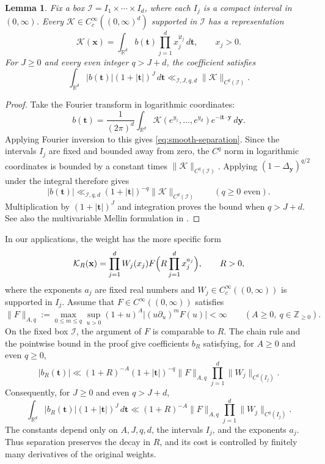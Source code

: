 \documentclass[11pt,a4paper]{article}
\numberwithin{equation}{section}
\numberwithin{figure}{section}
\newtheorem{lemma}[theorem]{Lemma}
\theoremstyle{definition}
\theoremstyle{remark}
\newcommand{\dd}{\,d}
\begin{document}
\begin{lemma}\label{lem:smooth}
Fix a box $\mathcal I=I_1\times\cdots\times I_d$, where each $I_j$ is a
compact interval in $(0,\infty)$. Every $\mathcal K\in C_c^\infty((0,\infty)^d)$
supported in $\mathcal I$ has a representation
\begin{equation}\label{eq:smooth-separation}
 \mathcal K(\mathbf x)=\int_{\mathbb R^d}b(\mathbf t)
       \prod_{j=1}^d x_j^{\mathrm i t_j}\dd\mathbf t,
 \qquad x_j>0.
\end{equation}
For $J\ge0$ and every even integer $q>J+d$, the coefficient satisfies
\[
 \int_{\mathbb R^d}|b(\mathbf t)|(1+|\mathbf t|)^J\dd\mathbf t
 \ll_{\mathcal I,J,q,d}\|\mathcal K\|_{C^q(\mathcal I)}.
\]
\end{lemma}
\begin{proof}
Take the Fourier transform in logarithmic coordinates:
\[
 b(\mathbf t)=\frac1{(2\pi)^d}\int_{\mathbb R^d}
 \mathcal K(e^{y_1},\ldots,e^{y_d})
 e^{-\mathrm i\mathbf t\cdot\mathbf y}\dd\mathbf y.
\]
Applying Fourier inversion to this gives \eqref{eq:smooth-separation}. Since the intervals $I_j$ are fixed and bounded away from zero, the $C^q$ norm in logarithmic coordinates is bounded by a constant times
$\|\mathcal K\|_{C^q(\mathcal I)}$. Applying
$(1-\Delta_{\mathbf y})^{q/2}$ under the integral therefore gives
\[
 |b(\mathbf t)|\ll_{\mathcal I,q,d}
 (1+|\mathbf t|)^{-q}\|\mathcal K\|_{C^q(\mathcal I)}
 \qquad(q\ge0\text{ even}).
\]
Multiplication by $(1+|\mathbf t|)^J$ and integration proves the
bound when $q>J+d$. See also the multivariable Mellin formulation
in \cite[\S10.1, (130)--(131)]{PY19}.
\end{proof}

In our applications, the weight has the more specific form
\[
 \mathcal K_R(\mathbf x)=\prod_{j=1}^dW_j(x_j)
 F\Bigl(R\prod_{j=1}^d x_j^{a_j}\Bigr),\qquad R>0,
\]
where the exponents $a_j$ are fixed real numbers and
$W_j\in C_c^\infty((0,\infty))$ is supported in $I_j$.
Assume that $F\in C^\infty((0,\infty))$ satisfies
\[
 \|F\|_{A,q}:=\max_{0\le m\le q}\sup_{u>0}
 (1+u)^A\bigl|(u\partial_u)^mF(u)\bigr|<\infty
 \qquad(A\ge0,\ q\in\mathbb Z_{\ge0}).
\]
On the fixed box $\mathcal I$, the argument of $F$ is comparable
to $R$. The chain rule and the pointwise bound in the proof give
coefficients $b_R$ satisfying, for $A\ge0$ and even $q\ge0$,
\begin{equation}\label{eq:smooth-pointwise}
 |b_R(\mathbf t)|
 \ll (1+R)^{-A}(1+|\mathbf t|)^{-q}\|F\|_{A,q}
       \prod_{j=1}^d\|W_j\|_{C^q(I_j)}.
\end{equation}
Consequently, for $J\ge0$ and even $q>J+d$,
\begin{equation}\label{eq:smooth-weight-bound}
 \int_{\mathbb R^d}|b_R(\mathbf t)|(1+|\mathbf t|)^J\dd\mathbf t
 \ll (1+R)^{-A}\|F\|_{A,q}
       \prod_{j=1}^d\|W_j\|_{C^q(I_j)}.
\end{equation}
The constants depend only on $A,J,q,d$, the intervals $I_j$, and
the exponents $a_j$. Thus separation preserves the decay in $R$,
and its cost is controlled by finitely many derivatives of the
original weights.
\end{document}

